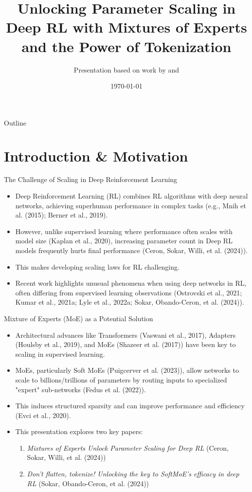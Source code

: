 \documentclass{beamer}
\title[MoE for Deep RL Scaling]{Unlocking Parameter Scaling in Deep RL with Mixtures of Experts and the Power of Tokenization}
\author{Presentation based on work by \ceronMoE{} and \sokarTokenize}
\date{\today}
\newcommand{\ceronMoE}{Ceron, Sokar, Willi, et al. (2024)}
\newcommand{\sokarTokenize}{Sokar, Obando-Ceron, et al. (2024)}
\newcommand{\puigcerverSoftMoE}{Puigcerver et al. (2023)}
\newcommand{\shazeerMoE}{Shazeer et al. (2017)}
\newcommand{\mnihDQN}{Mnih et al. (2015)}
\newcommand{\fedusSwitch}{Fedus et al. (2022)}
\begin{document}
\begin{frame}
  \titlepage
\end{frame}

\begin{frame}{Outline}
  \tableofcontents
\end{frame}

\section{Introduction \& Motivation}
\begin{frame}{The Challenge of Scaling in Deep Reinforcement Learning}
  \begin{itemize}
    \item Deep Reinforcement Learning (RL) combines RL algorithms with deep neural networks, achieving superhuman performance in complex tasks (e.g., \mnihDQN{}; Berner et al., 2019).
    \item However, unlike supervised learning where performance often scales with model size (Kaplan et al., 2020), increasing parameter count in Deep RL models frequently hurts final performance (\ceronMoE{}).
    \item This makes developing scaling laws for RL challenging.
    \item Recent work highlights unusual phenomena when using deep networks in RL, often differing from supervised learning observations (Ostrovski et al., 2021; Kumar et al., 2021a; Lyle et al., 2022a; \sokarTokenize{}).
  \end{itemize}
\end{frame}

\begin{frame}{Mixture of Experts (MoE) as a Potential Solution}
  \begin{itemize}
    \item Architectural advances like Transformers (Vaswani et al., 2017), Adapters (Houlsby et al., 2019), and MoEs (\shazeerMoE{}) have been key to scaling in supervised learning.
    \item MoEs, particularly Soft MoEs (\puigcerverSoftMoE{}), allow networks to scale to billions/trillions of parameters by routing inputs to specialized "expert" sub-networks (\fedusSwitch{}).
    \item This induces structured sparsity and can improve performance and efficiency (Evci et al., 2020).
    \item This presentation explores two key papers:
    \begin{enumerate}
        \item \textit{Mixtures of Experts Unlock Parameter Scaling for Deep RL} (\ceronMoE{})
        \item \textit{Don't flatten, tokenize! Unlocking the key to SoftMoE's efficacy in deep RL} (\sokarTokenize{})
    \end{enumerate}
  \end{itemize}
\end{frame}
\end{document}
